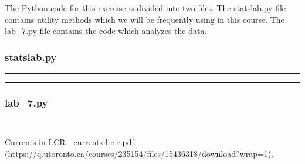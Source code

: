 \documentclass[a4paper,12pt]{article}
\begin{document}
The Python code for this exercise is divided into two files. The statslab.py file contains utility methods
which we will be frequently using in this course. The lab\_7.py file contains the code which analyzes
the data.

\subsubsection{statslab.py}
\noindent\rule{\textwidth}{1pt}

\noindent\rule{\textwidth}{1pt}

\pagebreak

\subsubsection{lab\_7.py}
\noindent\rule{\textwidth}{1pt}

\noindent\rule{\textwidth}{1pt}


\pagebreak

\begin{thebibliography}{99}

 Currents in LCR - currents-l-c-r.pdf (\url{https://q.utoronto.ca/courses/235154/files/15436318/download?wrap=1}).

\end{thebibliography}
\end{document}
